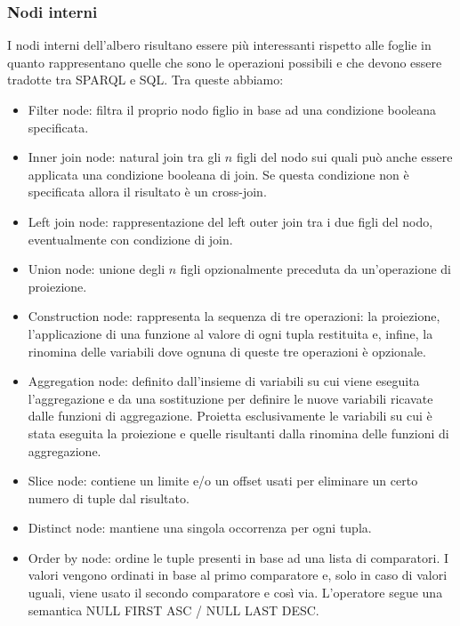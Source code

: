 \subsubsection*{Nodi interni} 
I nodi interni dell'albero risultano essere più interessanti rispetto alle foglie in quanto rappresentano quelle che sono le operazioni possibili e che devono essere tradotte tra SPARQL e SQL. Tra queste abbiamo:
    \begin{itemize}
        \item Filter node: filtra il proprio nodo figlio in base ad una condizione booleana specificata.
        \item Inner join node: natural join tra gli $n$ figli del nodo sui quali può anche essere applicata una condizione booleana di join. Se questa condizione non è specificata allora il risultato è un cross-join.
        \item Left join node: rappresentazione del left outer join tra i due figli del nodo, eventualmente con condizione di join.
        \item Union node: unione degli $n$ figli opzionalmente preceduta da un'operazione di proiezione.
        \item Construction node: rappresenta la sequenza di tre operazioni: la proiezione, l'applicazione di una funzione al valore di ogni tupla restituita e, infine, la rinomina delle variabili dove
            ognuna di queste tre operazioni è opzionale.
        \item Aggregation node: definito dall'insieme di variabili su cui viene eseguita l'aggregazione e da una sostituzione per definire le nuove variabili ricavate dalle funzioni di aggregazione. Proietta esclusivamente le variabili
            su cui è stata eseguita la proiezione e quelle risultanti dalla rinomina delle funzioni di aggregazione.
        \item Slice node: contiene un limite e/o un offset usati per eliminare un certo numero di tuple dal risultato.
        \item Distinct node: mantiene una singola occorrenza per ogni tupla.
        \item Order by node: ordine le tuple presenti in base ad una lista di comparatori. I valori vengono ordinati in base al primo comparatore e, solo in caso di valori uguali, viene usato il secondo comparatore e così via.
            L'operatore segue una semantica NULL FIRST ASC / NULL LAST DESC. 
    \end{itemize}

